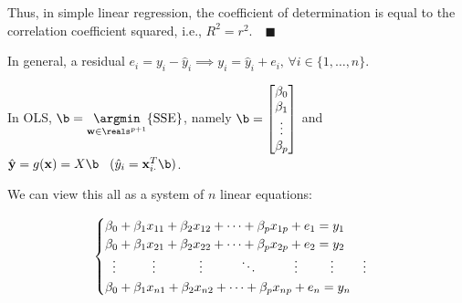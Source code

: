 \documentclass[12pt]{article}
\begin{document}
\begin{enumerate}
\begin{tcolorbox}[colback = white, sharp corners]
Thus, in simple linear regression, the coefficient of determination is equal to the correlation coefficient squared, i.e., $R^2 = r^2. \quad \blacksquare$

\end{tcolorbox}

\newpage

\begin{tcolorbox}[colback=white, sharp corners]

In general, a residual $e_i = y_i - \hat{y}_i \implies y_i = \hat{y}_i + e_i, \,  \forall i \in \lbrace 1, \ldots, n \rbrace.$ 

\vspace{2mm}

In OLS, $\b = \underset{\mathbf{w} \in \reals^{p+1}}{\argmin} \lbrace \mathrm{SSE} \rbrace$, namely $\b = \begin{bmatrix} \beta_0 \\ \beta_1 \\ \vdots \\ \beta_{p} \end{bmatrix}$ and $ \hat{\mathbf{y}}= g(\mathbf{x}) = X\b \hspace{3mm} (\hat{y}_i = \mathbf{x}_{i \cdot}^{T}\b)$.

We can view this all as a system of $n$ linear equations:

\[
	\begin{cases}
	\beta_0 + \beta_1 x_{11} + \beta_2 x_{12} + \cdots  + \beta_p x_{1p} + e_1 = y_1\\
	\beta_0 + \beta_1 x_{21} + \beta_2 x_{22} + \cdots  + \beta_p x_{2p} + e_2 = y_2\\
	\hspace{2mm} \vdots \hspace{10mm} \vdots \hspace{12mm} \vdots \hspace{10mm} \ddots \hspace{10mm} \vdots \hspace{9mm} \vdots \hspace{8mm} \vdots \\
	\beta_0 + \beta_1 x_{n1} + \beta_2 x_{n2} + \cdots + \beta_p x_{np} + e_n = y_n
	\end{cases}
\]

\vspace{2mm}


\end{tcolorbox}
\end{enumerate}
\end{document}

